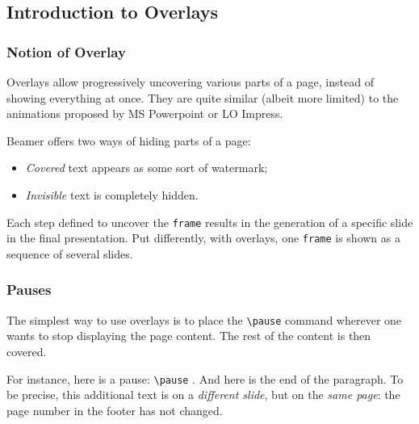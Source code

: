 \documentclass[10pt,    %
    english,            %
    xcolor=table,       %
    envcountsect,       %
    aspectratio=43      %
]{beamer}
\begin{document}
\subsection{Introduction to Overlays}
\begin{frame}
    \frametitle{Notion of Overlay}
    
    Overlays allow progressively uncovering various parts of a page, instead of showing everything at once. They are quite similar (albeit more limited) to the animations proposed by MS Powerpoint or LO Impress.
    
    \vspace{0.25cm}
    Beamer offers two ways of hiding parts of a page: 
    \begin{itemize}
        \item \textit{Covered} text appears as some sort of watermark;
        \item \textit{Invisible} text is completely hidden.
    \end{itemize}
    
    \vspace{0.25cm}
    Each step defined to uncover the \texttt{frame} results in the generation of a specific slide in the final presentation. Put differently, with overlays, one \texttt{frame} is shown as a sequence of several slides.
    
\end{frame}

\begin{frame}
    \frametitle{Pauses}
    
    The simplest way to use overlays is to place the \texttt{\textbackslash{}pause} command wherever one wants to stop displaying the page content. The rest of the content is then covered.
    
    \vspace{0.25cm}
    For instance, here is a pause: \texttt{\textbackslash{}pause} \pause. And here is the end of the paragraph. To be precise, this additional text is on a \textit{different slide}, but on the \textit{same page}: the page number in the footer has not changed.
    
    \vspace{0.25cm}
\end{frame}
\end{document}
